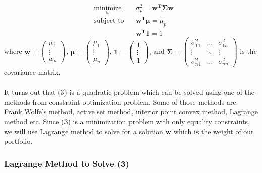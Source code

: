 \documentclass[12pt,titlepage,a4paper]{article}
\begin{document}
\begin{equation}
\begin{aligned}
& \underset{w}{\text{minimize}}
& &\sigma_p^2 = \mathbf{w^T\Sigma w}\\
& \text{subject to}
& & \mathbf{w^T}\pmb{\mu} = \mu_p \\
&&& \mathbf{w^T1}=1
\end{aligned}
\end{equation}
where $\mathbf{w} = \begin{pmatrix} w_1 \\ \vdots \\ w_n \end{pmatrix}$, 
$\pmb{\mu} = \begin{pmatrix} \mu_1 \\ \vdots \\ \mu_n \end{pmatrix}$, $\mathbf{1} = \begin{pmatrix}1 \\ \vdots \\ 1 \end{pmatrix}$, and $\mathbf{\Sigma} = \begin{pmatrix}\sigma_{11}^2 & \dots & \sigma_{1n}^2 \\ \vdots & \ddots & \vdots\\  \sigma_{n1}^2 & \dots & \sigma_{nn}^2 \end{pmatrix}$ is the covariance matrix.\\ \\ 
It turns out that (3) is a quadratic problem which can be solved using one of the methods from constraint optimization problem. Some of those methods are: Frank Wolfe's method, active set method, interior point convex method, Lagrange method etc. Since (3) is a minimization problem with only equality constraints, we will use Lagrange method to solve for a solution $\mathbf{w}$ which is the weight of our portfolio. 

\subsubsection{Lagrange Method to Solve (3)}
\end{document}
